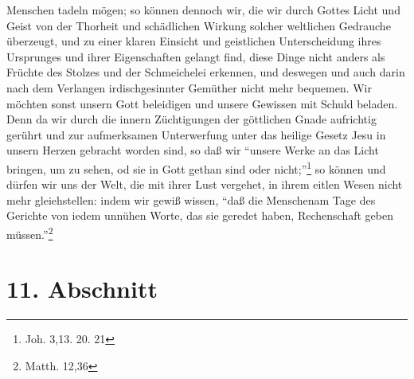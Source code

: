 Menschen tadeln mögen; so können dennoch wir, die wir durch Gottes Licht und
Geist von der Thorheit und schädlichen Wirkung solcher weltlichen Gedrauche
überzeugt, und zu einer klaren Einsicht und geistlichen Unterscheidung ihres
Ursprunges und ihrer Eigenschaften gelangt find, diese Dinge nicht anders als
Früchte des Stolzes und der Schmeichelei erkennen, und deswegen und auch darin
nach dem Verlangen irdischgesinnter Gemüther nicht mehr bequemen. Wir möchten
sonst unsern Gott beleidigen und unsere Gewissen mit Schuld beladen. Denn da wir
durch die innern Züchtigungen der göttlichen Gnade aufrichtig gerührt und zur
aufmerksamen Unterwerfung unter das heilige Gesetz Jesu in unsern Herzen
gebracht worden sind, so daß wir "`unsere Werke an das Licht bringen, um zu
sehen, od sie in Gott gethan sind oder nicht;"'\footnote{Joh. 3,13. 20. 21} so
können und dürfen wir uns der Welt, die mit ihrer Lust vergehet, in ihrem eitlen
Wesen nicht mehr gleiehstellen: indem wir gewiß wissen, "`daß die Menschenam
Tage des Gerichte von iedem unnühen Worte, das sie geredet haben, Rechenschaft
geben müssen."'\footnote{Matth. 12,36}

\section{11. Abschnitt} \label{kap10_ab11}

